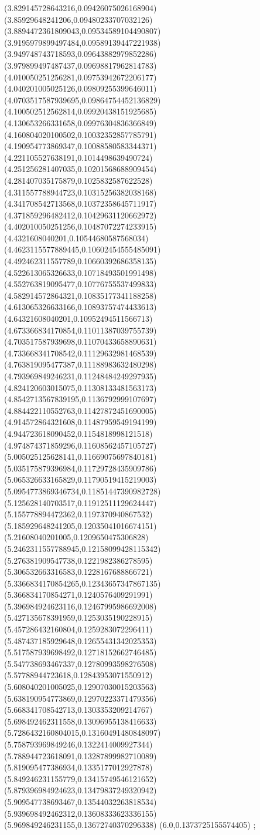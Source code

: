 {(3.829145728643216,0.09426075026168904)
(3.85929648241206,0.09480233707032126)
(3.8894472361809043,0.09534589104490807)
(3.9195979899497484,0.09589139447221938)
(3.949748743718593,0.09643882979852286)
(3.979899497487437,0.09698817962814783)
(4.010050251256281,0.09753942672206177)
(4.040201005025126,0.09809255399646011)
(4.0703517587939695,0.09864754452136829)
(4.100502512562814,0.09920438151925685)
(4.130653266331658,0.09976304836366849)
(4.160804020100502,0.10032352857785791)
(4.190954773869347,0.10088580583344371)
(4.221105527638191,0.1014498639490724)
(4.251256281407035,0.10201568688909454)
(4.281407035175879,0.1025832587622528)
(4.311557788944723,0.10315256382038168)
(4.341708542713568,0.10372358645711917)
(4.371859296482412,0.10429631120662972)
(4.402010050251256,0.10487072274233915)
(4.4321608040201,0.10544680587568034)
(4.4623115577889445,0.10602454555485091)
(4.492462311557789,0.10660392686358135)
(4.522613065326633,0.10718493501991498)
(4.552763819095477,0.10776755537499833)
(4.582914572864321,0.10835177341188258)
(4.613065326633166,0.10893757474433613)
(4.64321608040201,0.10952494511566713)
(4.673366834170854,0.11011387039755739)
(4.703517587939698,0.11070433658890631)
(4.733668341708542,0.11129632981468539)
(4.763819095477387,0.11188983632480298)
(4.793969849246231,0.11248484249297935)
(4.824120603015075,0.11308133481563173)
(4.8542713567839195,0.1136792999107697)
(4.884422110552763,0.11427872451690005)
(4.914572864321608,0.11487959549194199)
(4.944723618090452,0.1154818998121518)
(4.974874371859296,0.11608562457105727)
(5.005025125628141,0.11669075697840181)
(5.035175879396984,0.11729728435909786)
(5.065326633165829,0.11790519415219003)
(5.0954773869346734,0.11851447390982728)
(5.125628140703517,0.11912511129624447)
(5.155778894472362,0.1197370940867532)
(5.185929648241205,0.12035041016674151)
(5.21608040201005,0.1209650475306828)
(5.2462311557788945,0.12158099428115342)
(5.276381909547738,0.1221982386278595)
(5.306532663316583,0.1228167688866721)
(5.3366834170854265,0.12343657347867135)
(5.366834170854271,0.1240576409291991)
(5.396984924623116,0.12467995986692008)
(5.427135678391959,0.1253035190228915)
(5.457286432160804,0.1259283072296411)
(5.487437185929648,0.12655431342025353)
(5.517587939698492,0.12718152662746485)
(5.547738693467337,0.12780993598276508)
(5.57788944723618,0.12843953071550912)
(5.608040201005025,0.12907030015203563)
(5.638190954773869,0.12970223371479356)
(5.668341708542713,0.1303353209214767)
(5.698492462311558,0.13096955138416633)
(5.7286432160804015,0.13160491480848097)
(5.758793969849246,0.1322414009927344)
(5.788944723618091,0.13287899982710089)
(5.819095477386934,0.1335177012927878)
(5.849246231155779,0.13415749546121652)
(5.879396984924623,0.13479837249320942)
(5.909547738693467,0.13544032263818534)
(5.939698492462312,0.13608333623336155)
(5.969849246231155,0.13672740370296338)
(6.0,0.1373725155574405)
};
